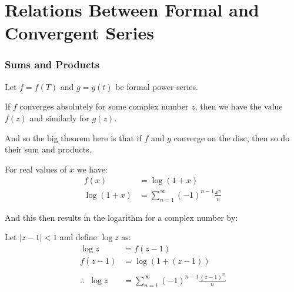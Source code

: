 \section{Relations Between Formal and Convergent Series}

\subsubsection*{Sums and Products}
Let $f = f(T)$ and $g = g(t)$ be formal power series.

If $f$ converges absolutely for some complex number $z$, then we have the value $f(z)$ and similarly for $g(z).$

And so the big theorem here is that if $f$ and $g$ converge on the disc, then so do their sum and products.

\begin{defn}
    For real values of $x$ we have:
    \begin{align*}
        f(x)         & = \log (1 + x)                                   \\
        \log (1 + x) & = \sum_{n=1}^{\infty} (-1)^{n - 1} \frac{x^n}{n}
    \end{align*}
\end{defn}

And this then results in the logarithm for a complex number by:
\begin{defn}
    Let $|z - 1| < 1$ and define $\log z$ as:
    \begin{align*}
        \log z                 & = f(z - 1)                                               \\
        f(z - 1)               & = \log(1 + (z - 1))                                      \\
        \\
        \therefore \;\; \log z & = \sum_{n=1}^{\infty} (-1)^{n - 1} \frac{({z - 1})^n}{n}
    \end{align*}
\end{defn}
